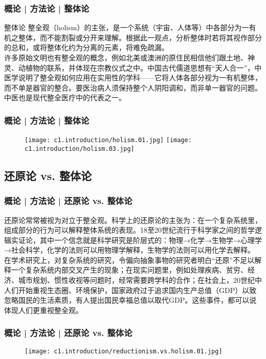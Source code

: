 \begin{frame}
  \frametitle{概论 | 方法论 | 整体论}
  \begin{block}{整体论}
整全观（holism）的主张，是一个系统（宇宙、人体等）中各部分为一有机之整体，而不能割裂或分开来理解。根据此一观点，分析整体时若将其视作部分的总和，或将整体化约为分离的元素，将难免疏漏。\\
\vspace{1em}
许多原始文明也有整全观的概念，例如北美或澳洲的原住民相信他们跟土地、神灵、动植物的联系，并体现在宗教仪式之中。中国古代儒道思想有“天人合一”，中医学说明了整全观如何应用在实用性的学科——它将人体各部分视为一有机整体，而不单是器官的整合。要医治病人须保持整个人阴阳调和，而非单一器官的问题。中医也是现代整全医疗中的代表之一。
  \end{block}
\end{frame}

\begin{frame}
  \frametitle{概论 | 方法论 | 整体论}
  \begin{figure}
    \centering
    \texttt{[image: c1.introduction/holism.01.jpg]}\quad
    \texttt{[image: c1.introduction/holism.03.jpg]}
  \end{figure}
\end{frame}

\subsection{还原论 vs. 整体论}
\begin{frame}
  \frametitle{概论 | 方法论 | 还原论 vs. 整体论}
还原论常常被视为对立于整全观。科学上的还原论的主张为：在一个复杂系统里，组成部分的行为可以解释整体系统的表现。18至20世纪流行于科学家之间的哲学逻辑实证论，其中一个信念就是科学研究是阶层式的：物理→化学→生物学→心理学→社会科学，化学的法则可以用物理学解释，生物学的法则可以用化学去解释。\\
\vspace{1em}
在学术研究上，对复杂系统的研究，令偏向抽象事物的研究者明白“还原”不足以解释一个复杂系统内部交叉产生的现象；在现实问题里，例如处理疾病、贫穷、经济、城市规划、惯性收视等问题时，经常需要跨学科的合作；在社会上，20世纪中人们开始重视生态圈、环境保护，国家政府过于追求国内生产总值（GDP）以致忽略国民的生活素质，有人提出国民幸福总值以取代GDP。这些事件，都可以说体现人们更重视整全观。
\end{frame}

\begin{frame}
  \frametitle{概论 | 方法论 | 还原论 vs. 整体论}
  \begin{figure}
    \centering
    \texttt{[image: c1.introduction/reductionism.vs.holism.01.jpg]}
  \end{figure}
\end{frame}

